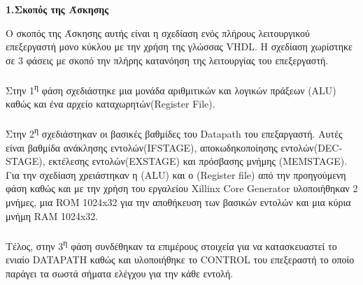 { \large \bfseries 1.Σκοπός της Άσκησης}\\ %

\begin{justify}

Ο σκοπός της Άσκησης αυτής είναι η σχεδίαση ενός πλήρους λειτουργικού επεξεργαστή μονο κύκλου με την χρήση της γλώσσας \textlatin{VHDL}. 
Η σχεδίαση χωρίστηκε σε 3 φάσεις με σκοπό την πλήρης κατανόηση της λειτουργίας του επεξεργαστή.\\\\
Στην 1\textsuperscript{η} φάση σχεδιάστηκε μια μονάδα αριθμιτικών και λογικών πράξεων
(\textlatin{ALU}) καθώς και ένα αρχείο καταχωρητών(\textlatin{Register File}).\\\\
Στην 2\textsuperscript{η} σχεδιάστηκαν οι βασικές βαθμίδες του \textlatin{Datapath}
του επεξαργαστή. Αυτές είναι βαθμίδα ανάκλησης εντολών\textlatin{(IFSTAGE)}, αποκωδηκοποίησης εντολών\textlatin{(DECSTAGE)}, εκτέλεσης εντολών\textlatin{(EXSTAGE)} και πρόσβασης μνήμης \textlatin{(MEMSTAGE)}. Για την σχεδίαση χρειάστηκαν η \textlatin{(ALU)} και ο \textlatin{(Register file)} από την προηγούμενη φάση καθώς και με την χρήση του εργαλείου \textlatin{Xillinx Core Generator} υλοποιήθηκαν 2 μνήμες, μια \textlatin{ROM 1024x32} για την αποθήκευση των βασικών εντολών και μια κύρια μνήμη \textlatin{RAM 1024x32}.\\\\
Τέλος, στην 3\textsuperscript{η} φάση συνδέθηκαν τα επιμέρους στοιχεία για να κατασκευαστεί το ενιαίο \textlatin{DATAPATH} καθώς και υλοποιήθηκε το \textlatin{CONTROL} του επεξεραστή το οποίο παράγει τα σωστά σήματα ελέγχου για την κάθε εντολή.
\end{justify}


\vspace{0.5cm}
